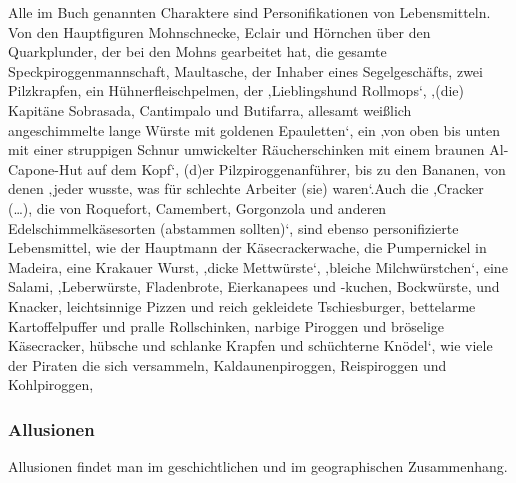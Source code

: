 {Alle im Buch genannten Charaktere sind Personifikationen von Lebensmitteln. Von den Hauptfiguren Mohnschnecke,\cite[S.13]{pir} Eclair \cite[S.15]{pir} und Hörnchen \cite[S.25]{pir} über den Quarkplunder, der bei den Mohns gearbeitet hat,\cite[S.15]{pir} die gesamte Speckpiroggenmannschaft,\cite[S.47ff]{pir} Maultasche,\cite[S.108]{pir} der Inhaber eines Segelgeschäfts,\cite[S.107f]{pir} zwei Pilzkrapfen,\cite[S.113]{pir} ein Hühnerfleischpelmen,\cite[S.116]{pir} der ‚Lieblingshund Rollmops‘,\cite[S.117]{pir} ‚(die) Kapitäne Sobrasada, Cantimpalo und Butifarra, allesamt weißlich angeschimmelte lange Würste mit goldenen Epauletten‘,\cite[S.253]{pir} ein ‚von oben bis unten mit einer struppigen Schnur umwickelter Räucherschinken mit einem braunen Al-Capone-Hut auf dem Kopf‘,\cite[S.291]{pir} (d)er Pilzpiroggenanführer,\cite[S.318]{pir} bis zu den Bananen,\cite[S.385]{pir} von denen ‚jeder wusste, was für schlechte Arbeiter (sie) waren‘.\cite[S.385]{pir}Auch die  ‚Cracker (…), die von Roquefort, Camembert, Gorgonzola und anderen Edelschimmelkäsesorten (abstammen sollten)‘,\cite[S.140]{pir} sind ebenso personifizierte Lebensmittel, wie der Hauptmann der Käsecrackerwache,\cite[S.143]{pir} die Pumpernickel in Madeira,\cite[S.195]{pir} eine Krakauer Wurst,\cite[S.285]{pir} ‚dicke Mettwürste‘,\cite[S.291]{pir} ‚bleiche Milchwürstchen‘,\cite[S.291]{pir} eine Salami,\cite[S.291]{pir} ‚Leberwürste, Fladenbrote, Eierkanapees und -kuchen, Bockwürste, und Knacker, leichtsinnige Pizzen und reich gekleidete Tschiesburger, bettelarme Kartoffelpuffer und pralle Rollschinken, narbige Piroggen und bröselige Käsecracker, hübsche und schlanke Krapfen und schüchterne Knödel‘,\cite[S.382]{pir} wie viele der Piraten die sich versammeln, Kaldaunenpiroggen,\cite[S.420]{pir} Reispiroggen \cite[S.420]{pir} und Kohlpiroggen,\cite[S.420]{pir}


\subsubsection{Allusionen}

Allusionen findet man im geschichtlichen und im geographischen Zusammenhang.

}
